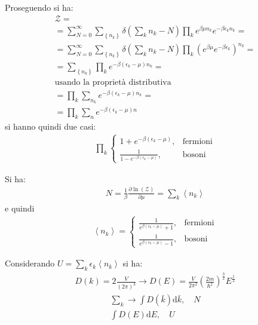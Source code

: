 Proseguendo si ha:
\begin{equation}\begin{split}
\mathcal{Z}=\\
=\sum_{N=0}^{\infty }{\sum_{\left\{n_k\right\}}{\delta\left(\sum_{k}{n_k-N}\right)}\prod_{k}{e^{\beta\mu n_k}e^{-\beta\epsilon_k n_k}}}=\\
=\sum_{N=0}^{\infty }{\sum_{\left\{n_k\right\}}{\delta\left(\sum_k{n_k-N}\right)}\prod_k{\left(e^{\beta\mu}e^{-\beta\epsilon_k}\right)^{n_k}}}=\\
=\sum_{\left\{n_k\right\}}{\prod_{k}{e^{-\beta\left(\epsilon_k-\mu\right)n_k}}}=\\
\textrm{usando la proprietà distributiva} \\
=\prod_k{\sum_{n_k}{e^{-\beta\left(\epsilon_k-\mu\right)n_k}}}=\\
=\prod_k{\sum_n{e^{-\beta\left(\epsilon_k-\mu\right)n}}}
\end{split}\end{equation}
si hanno quindi due casi:
\begin{equation}\begin{split}
\prod_k
\begin{cases}
1+e^{-\beta\left(\epsilon_k-\mu\right)}, & \textrm{fermioni} \\
\frac{1}{1-e^{-\beta\left(\epsilon_k-\mu\right)}}, & \textrm{bosoni}
\end{cases}
\end{split}\end{equation}

Si ha:
\begin{equation}\begin{split}
N=\frac{1}{\beta}\frac{\partial \ln{\left(\mathcal{Z}\right)}}{\partial \mu}=\sum_k{\left\langle n_k \right\rangle}
\end{split}\end{equation}
e quindi
\begin{equation}\begin{split}
\left\langle n_k \right\rangle=
\begin{cases}
\frac{1}{e^{\beta\left(\epsilon_k-\mu\right)}+1}, & \textrm{fermioni}\\
\frac{1}{e^{\beta\left(\epsilon_k-\mu\right)}-1}, & \textrm{bosoni}
\end{cases}
\end{split}\end{equation}

Considerando $U=\sum_k{\epsilon_k\left\langle n_k \right\rangle}$ si ha:
\begin{equation}\begin{split}
D\left(k\right)=2\frac{V}{\left(2\pi\right)^3} \rightarrow D\left(E\right)=\frac{V}{2\pi^2}\left(\frac{2m}{\hbar ^2}\right)^{\frac{3}{2}}E^{\frac{1}{2}}
\end{split}\end{equation}
\begin{equation}\begin{split}
\sum_k\longrightarrow \int{D\left(\bar k\right)\textrm{d}\bar k}, \quad N\\
\int{D\left(E\right)\textrm{d}E}, \quad U
\end{split}\end{equation}

